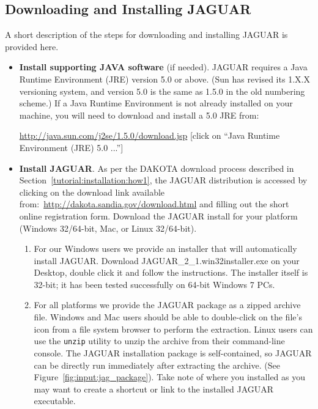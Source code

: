 \subsection{Downloading and Installing JAGUAR}

A short description of the steps for downloading and installing JAGUAR
is provided here.

\begin{itemize}
\item \textbf{Install supporting JAVA software} (if needed).  JAGUAR
  requires a Java Runtime Environment (JRE) version 5.0 or above. (Sun
  has revised its 1.X.X versioning system, and version 5.0 is the same
  as 1.5.0 in the old numbering scheme.)  If a Java Runtime
  Environment is not already installed on your machine, you will need
  to download and install a 5.0 JRE from:

\url{http://java.sun.com/j2se/1.5.0/download.jsp} 
{\small [click on ``Java Runtime Environment (JRE) 5.0 ...'']}

\item \textbf{Install JAGUAR}.  As per the DAKOTA download process
  described in Section~\ref{tutorial:installation:how1}, the JAGUAR
  distribution is accessed by clicking on the download link available
  from:~\url{http://dakota.sandia.gov/download.html} and
  filling out the short online registration form.  Download the JAGUAR
  install for your platform (Windows 32/64-bit, Mac, or Linux 32/64-bit).

\begin{enumerate}

\item For our Windows users we provide an installer that will automatically install JAGUAR. 
Download JAGUAR\_2\_1.win32installer.exe on your Desktop, double click it and follow the instructions. 
The installer itself is 32-bit; it has been tested successfully on 64-bit Windows 7 PCs. 

\item For all platforms we provide the JAGUAR package as a zipped archive file. 
Windows and Mac users should be able to double-click on the file's icon from a
file system browser to perform the extraction. Linux users can use
the {\tt unzip} utility to unzip the archive from their command-line
console.  The JAGUAR installation package is self-contained, so JAGUAR
can be directly run immediately after extracting the archive. (See
Figure~\ref{fig:input:jag_package}). Take note of where you installed
as you may want to create a shortcut or link to the installed JAGUAR 
executable.
\end{enumerate}


\end{itemize}
